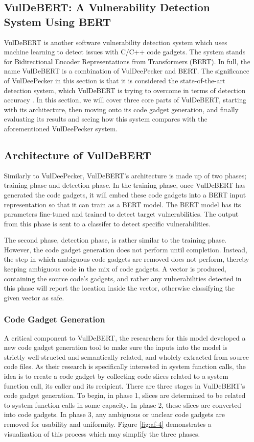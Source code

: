 \documentclass[12pt,twocolumn,letterpaper]{article}
\begin{document}
\subsection{VulDeBERT: A Vulnerability Detection System Using BERT}
\label{sub:vuldebert}
VulDeBERT is another software vulnerability detection system which uses machine learning to detect issues with C/C++ code gadgets. The system stands for Bidirectional Encoder Representations from Transformers (BERT).
In full, the name VulDeBERT is a combination of VulDeePecker and BERT. The significance of VulDeePecker in this section is that it is considered the state-of-the-art detection system, which
VulDeBERT is trying to overcome in terms of detection accuracy \cite{Kim22}. In this section, we will cover three core parts of VulDeBERT, starting with its architecture,
then moving onto its code gadget generation, and finally evaluating its results and seeing how this system compares with the aforementioned VulDeePecker system.
\subsection{Architecture of VulDeBERT}
Similarly to VulDeePecker, VulDeBERT's architecture is made up of two phases; training phase and detection phase.
In the training phase, once VulDeBERT has generated the code gadgets, it will embed these code gadgets into a BERT input representation so that it can train
as a BERT model. The BERT model has its parameters fine-tuned and trained to detect target vulnerabilities. The output from this phase
is sent to a classifer to detect specific vulnerabilities.

The second phase, detection phase, is rather similar to the training phase. However, the code gadget generation does not perform until completion. Instead,
the step in which ambiguous code gadgets are removed does not perform, thereby keeping ambiguous code in the mix of code gadgets.
A vector is produced, containing the source code's gadgets, and rather any vulnerabilities detected in this phase will report the location inside
the vector, otherwise classifying the given vector as safe.

\subsubsection{Code Gadget Generation}
A critical component to VulDeBERT, the researchers for this model developed a new code gadget generation tool to
make sure the inputs into the model is strictly well-structed and semantically related, and wholely extracted from source code files.
As their research is specifically interested in system function calls, the idea is to create a code gadget by collecting
code slices related to a system function call, its caller and its recipient. There are three stages in VulDeBERT's code gadget generation.
To begin, in phase 1, slices are determined to be related to system function calls in some capacity. In phase 2, these slices are
converted into code gadgets. In phase 3, any ambiguous or unclear code gadgets are removed for usability and uniformity. 
Figure \ref{fig:af-4} demonstrates a visualization of this process which may simplify the three phases.
\end{document}
